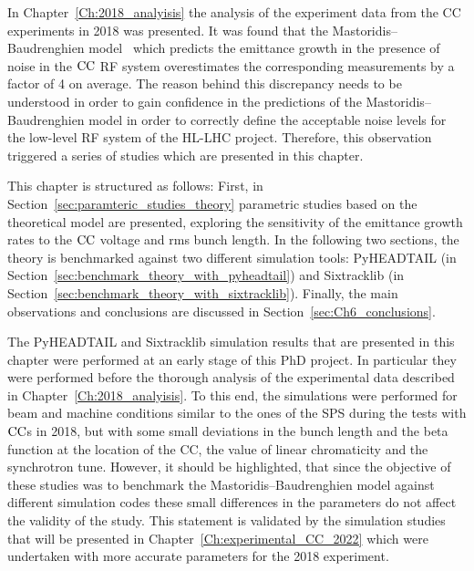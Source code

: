 In Chapter~\ref{Ch:2018_analyisis} the analysis of the experiment data from the CC experiments in 2018 was presented. It was found that the Mastoridis--Baudrenghien model~\cite{PhysRevSTAB.18.101001} which predicts the emittance growth in the presence of noise in the ${\mathrm{CC}}$ RF system overestimates the corresponding measurements by a factor of 4 on average. The reason behind this discrepancy needs to be understood in order to gain confidence in the predictions of the Mastoridis--Baudrenghien model in order to correctly define the acceptable noise levels for the low-level RF system of the HL-LHC project. Therefore, this observation triggered a series of studies which are presented in this chapter.

This chapter is structured as follows: First, in Section~\ref{sec:paramteric_studies_theory} parametric studies based on the theoretical model are presented, exploring the sensitivity of the emittance growth rates to the ${\mathrm{CC}}$ voltage and rms bunch length. In the following two sections, the theory is benchmarked against two different simulation tools: PyHEADTAIL (in Section~\ref{sec:benchmark_theory_with_pyheadtail}) and Sixtracklib (in Section~\ref{sec:benchmark_theory_with_sixtracklib}). Finally, the main observations and conclusions are discussed in Section~\ref{sec:Ch6_conclusions}.

The PyHEADTAIL and Sixtracklib simulation results that are presented in this chapter were performed at an early stage of this PhD project. In  particular they were performed before the thorough analysis of the experimental data described in Chapter~\ref{Ch:2018_analyisis}. To this end, the simulations were performed for beam and machine conditions similar to the ones of the SPS during the tests with ${\mathrm{CC}}$s in 2018, but with some small deviations in the bunch length and the beta function at the location of the CC, the value of linear chromaticity and the synchrotron tune. However, it should be highlighted, that since the objective of these studies was to benchmark the Mastoridis--Baudrenghien model against different simulation codes these small differences in the parameters do not affect the validity of the study. This statement is validated by the simulation studies that will be presented in Chapter~\ref{Ch:experimental_CC_2022} which were undertaken with more accurate parameters for the 2018 experiment.


